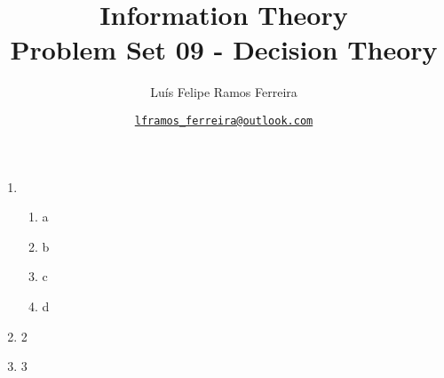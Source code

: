 \documentclass{article}
\title{Information Theory \\ \large Problem Set 09 - Decision Theory}
\author{Luís Felipe Ramos Ferreira}
\date{\href{mailto:lframos\_ferreira@outlook.com}{\texttt{lframos\_ferreira@outlook.com}}
}
\begin{document}
\maketitle

\begin{enumerate}
        \item \begin{enumerate}
		      \item a
		      \item b
		      \item c
		      \item d
	      \end{enumerate}
	\item 2
	\item 3
\end{enumerate}


\nocite{*}
\end{document}
